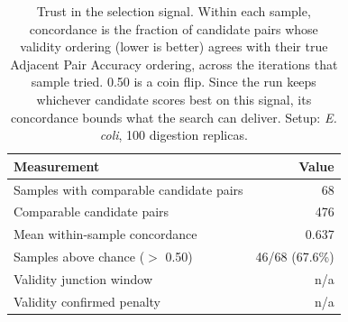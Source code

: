 \begin{table}[!tb]
  \centering
  \caption{Trust in the selection signal. Within each sample, concordance is the fraction of candidate pairs whose validity ordering (lower is better) agrees with their true Adjacent Pair Accuracy ordering, across the iterations that sample tried. 0.50 is a coin flip. Since the run keeps whichever candidate scores best on this signal, its concordance bounds what the search can deliver. Setup: \textnormal{\textnormal{\textit{E. coli}}}, 100 digestion replicas.}
  \label{tab:validity_concordance_ecoli_r100}
  \begin{tabular}{lr}
    \toprule
    Measurement & Value \\
    \midrule
    Samples with comparable candidate pairs & 68 \\
    Comparable candidate pairs & 476 \\
    Mean within-sample concordance & 0.637 \\
    Samples above chance ($>$ 0.50) & 46/68 (67.6\%) \\
    Validity junction window & n/a \\
    Validity confirmed penalty & n/a \\
    \bottomrule
  \end{tabular}
\end{table}
